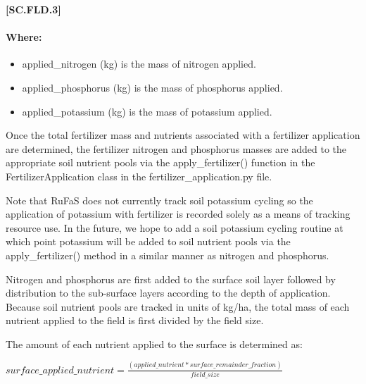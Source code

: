             {\raggedleft \textbf{[SC.FLD.3]}\par}
            \vspace{0.5cm} 

\paragraph{Where:}
\begin{itemize}
    \item applied\_nitrogen (kg) is the mass of nitrogen applied.
    \item applied\_phosphorus (kg) is the mass of phosphorus applied.
    \item applied\_potassium (kg) is the mass of potassium applied.
\end{itemize}
\vspace{0.2cm}

Once the total fertilizer mass and nutrients associated with a fertilizer application are determined, the fertilizer nitrogen and phosphorus masses are added to the appropriate soil nutrient pools via the apply\_fertilizer() function in the FertilizerApplication class in the fertilizer\_application.py file. 
\vspace{0.2cm}

Note that RuFaS does not currently track soil potassium cycling so the application of potassium with fertilizer is recorded solely as a means of tracking resource use. In the future, we hope to add a soil potassium cycling routine at which point potassium will be added to soil nutrient pools via the apply\_fertilizer() method in a similar manner as nitrogen and phosphorus.
\vspace{0.2cm}

Nitrogen and phosphorus are first added to the surface soil layer followed by distribution to the sub-surface layers according to the depth of application. Because soil nutrient pools are tracked in units of kg/ha, the total mass of each nutrient applied to the field is first divided by the field size.
\vspace{0.2cm}


The amount of each nutrient applied to the surface is determined as:
            \vspace{0.5cm} 
    
    \begin{center}
        \(surface\_applied\_nutrient=\frac{(applied\_nutrient * surface\_remainder\_fraction)}{field\_size} \)
    \end{center}
        \vspace{0.5cm} 
    

